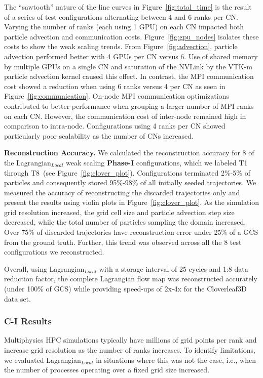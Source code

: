 The ``sawtooth'' nature of the line curves in Figure~\ref{fig:total_time} is the result of a series of test configurations alternating between 4 and 6 ranks per CN.
%
Varying the number of ranks (each using 1 GPU) on each CN impacted both particle advection and communication costs.
%
Figure~\ref{fig:gpu_nodes} isolates these costs to show the weak scaling trends.
%
From Figure~\ref{fig:advection}, particle advection performed better with 4 GPUs per CN versus 6.
%
Use of shared memory by multiple GPUs on a single CN and saturation of the NVLink by the VTK-m particle advection kernel caused this effect.
%
In contrast, the MPI communication cost showed a reduction when using 6 ranks versus 4 per CN as seen in Figure~\ref{fig:communication}. 
%
On-node MPI communication optimizations contributed to better performance when grouping a larger number of MPI ranks on each CN. 
%
However, the communication cost of inter-node remained high in comparison to intra-node.
%
Configurations using 4 ranks per CN showed particularly poor scalability as the number of CNs increased.
%

\textbf{Reconstruction Accuracy.}
We calculated the reconstruction accuracy for 8 of the Lagrangian$_{Local}$ weak scaling \textbf{Phase-I} configurations, which we labeled T1 through T8~(see Figure~\ref{fig:clover_plot}). 
%
Configurations terminated 2\%-5\% of particles and consequently stored 95\%-98\% of all initially seeded trajectories. 
%
We measured the accuracy of reconstructing the discarded trajectories only and present the results using violin plots in Figure~\ref{fig:clover_plot}.
%
As the simulation grid resolution increased, the grid cell size and particle advection step size decreased, while the total number of particles sampling the domain increased. 
%
Over 75\% of discarded trajectories have reconstruction error under 25\% of a GCS from the ground truth.
%
Further, this trend was observed across all the 8 test configurations we reconstructed. 

%
Overall, using Lagrangian$_{Local}$ with a storage interval of 25 cycles and 1:8 data reduction factor, the complete Lagrangian flow map was reconstructed accurately (under 100\% of GCS) while providing speed-ups of 2x-4x for the Cloverleaf3D data set.


\vspace{-2mm}
\subsubsection{C-I Results} 
%

%
Multiphysics HPC simulations typically have millions of grid points per rank and increase grid resolution as the number of ranks increases. 
%
To identify limitations, we evaluated Lagrangian$_{Local}$ in situations where this was not the case, i.e., when the number of processes operating over a fixed grid size increased.
%

